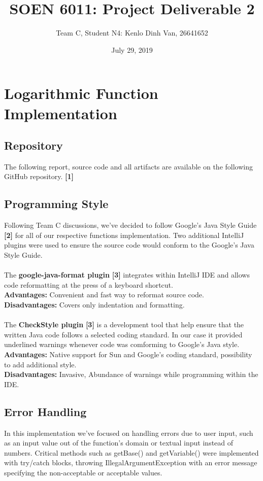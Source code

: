 \documentclass[12pt]{extarticle}
\title{SOEN 6011: Project Deliverable 2}
\author{Team C, Student N4: Kenlo Dinh Van, 26641652}
\date{July 29, 2019}
\newcommand{\<}{\langle}
\renewcommand{\>}{\rangle}
\theoremstyle{definition}
\begin{document}
\maketitle

\section{Logarithmic Function Implementation}
\subsection{Repository}
The following report, source code and all artifacts are available on the following GitHub repository. \textbf{[1]}

\subsection{Programming Style}
Following Team C discussions, we've decided to follow Google's Java Style Guide \textbf{[2]} for all of our respective functions implementation. Two additional IntelliJ plugins were used to ensure the source code would conform to the Google's Java Style Guide.\\ \\
The \textbf{google-java-format plugin }\textbf{[3]} integrates within IntelliJ IDE and allows code reformatting at the press of a keyboard shortcut.\\
\textbf{Advantages:} Convenient and fast way to reformat source code.\\
\textbf{Disadvantages:} Covers only indentation and formatting.\\ \\
The \textbf{CheckStyle plugin }\textbf{[3]} is a development tool that help ensure that the written Java code follows a selected coding standard. In our case it provided underlined warnings whenever code was comforming to Google's Java style.\\
\textbf{Advantages:} Native support for Sun and Google's coding standard, possibility to add additional style.\\
\textbf{Disadvantages:} Invasive, Abundance of warnings while programming within the IDE.\\

\subsection{Error Handling}
In this implementation we've focused on handling errors due to user input, such as an input value out of the function's domain or textual input instead of numbers. Critical methods such as getBase() and getVariable() were implemented with try/catch blocks, throwing IllegalArgumentException with an error message specifying the non-acceptable or acceptable values.
\end{document}
